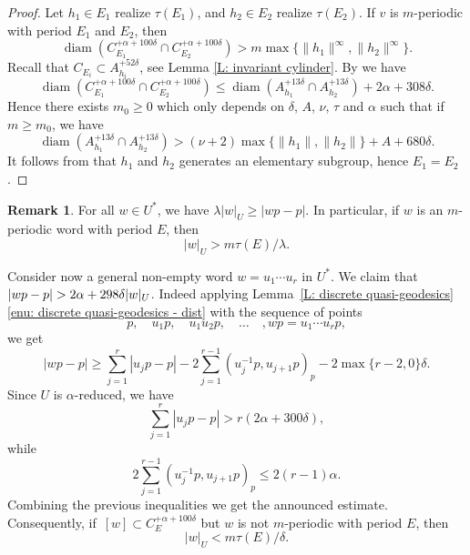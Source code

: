 \documentclass[JEP,XML,SOM,Unicode, NoEqCountersInSection,published]{cedram}
\theoremstyle{plain}
\theoremstyle{definition}
\newtheorem{rem}[thm]{Remark}
\DeclareMathOperator{\diam}{diam}
\begin{document}
\begin{proof}
Let $h_1\in E_1$ realize $\tau(E_1)$, and $h_2\in E_2$ realize $\tau(E_2)$.
If $v$ is $m$-periodic with period $E_1$ and $E_2$, then\vspace*{-3pt}\enlargethispage{\baselineskip}%
\[
\diam \left( C_{E_1}^{+ \alpha + 100\delta} \cap C_{E_2}^{+\alpha + 100\delta}\right)
> m \max \{\| h_1 \|^\infty,\| h_2 \|^\infty\}.
\]
Recall that $C_{E_i}\subset A_{h_i}^{+52\delta}$, see Lemma \ref{L: invariant cylinder}.
By \cite[Lem.\,2.13]{coulon_geometry_2014} we have\vspace*{-3pt}
\begin{equation*}
\diam \left( C_{E_1}^{+ \alpha + 100\delta} \cap C_{E_2}^{+\alpha + 100\delta}\right)
\leq \diam \left(A_{h_1}^{+13\delta} \cap A_{h_2}^{+13\delta} \right) + 2\alpha + 308\delta.
\end{equation*}
Hence there exists $m_0 \geq 0$ which only depends on $\delta$, $A$, $\nu$, $\tau$ and $\alpha$ such that if $m \geq m_0$, we have\vspace*{-3pt}
\begin{equation*}
\diam \left(A_{h_1}^{+13\delta} \cap A_{h_2}^{+13\delta} \right)
> (\nu +2)\max\{\| h_1 \|,\| h_2 \|\} +A + 680\delta.
\end{equation*}
It follows from \cite[Prop.\,3.44]{coulon_partial_2016} that $h_1$ and $h_2$ generates an elementary subgroup, hence $E_1 = E_2$.
\end{proof}

\begin{rem}
\label{R: growth 1}
For all $w\in U^*$, we have $\lambda |w|_U \geqslant |wp-p|.$
In particular, if $w$ is an $m$-periodic word with period $E$, then\vspace*{-3pt}
\[
|w|_U > m \tau(E)/\lambda.
\]

Consider now a general non-empty word $w = u_1\cdots u_r$ in $U^*$.
We claim that $|wp-\nobreak p|> 2 \alpha + 298\delta|w|_U$.
Indeed applying Lemma~\ref{L: discrete quasi-geodesics}\eqref{enu: discrete quasi-geodesics - dist} with the sequence of points
\begin{equation*}
p, \quad u_1p, \quad u_1u_2p, \quad\dots\quad, wp = u_1\cdots u_rp,
\end{equation*}
we get\vspace*{-3pt}
\begin{equation*}
|wp -p| \geq \sum_{j = 1}^r |u_jp - p| - 2 \sum_{j = 1}^{r-1} (u_j^{-1}p,u_{j+1}p)_p - 2\max\{r-2,0\}\delta.
\end{equation*}
Since $U$ is $\alpha$-reduced, we have\vspace*{-3pt}
\begin{equation*}
\sum_{j = 1}^r |u_jp - p| > r(2\alpha + 300\delta),
\end{equation*}
while\vspace*{-3pt}
\begin{equation*}
2 \sum_{j = 1}^{r-1} (u_j^{-1}p,u_{j+1}p)_p \leq 2(r-1)\alpha.
\end{equation*}
Combining the previous inequalities we get the announced estimate.
Consequently, if~$[w] \subset C_E^{+\alpha + 100\delta}$ but $w$ is not $m$-periodic with period $E$, then
\[
|w|_U < m \tau(E)/\delta.
\]
\end{rem}
\end{document}
